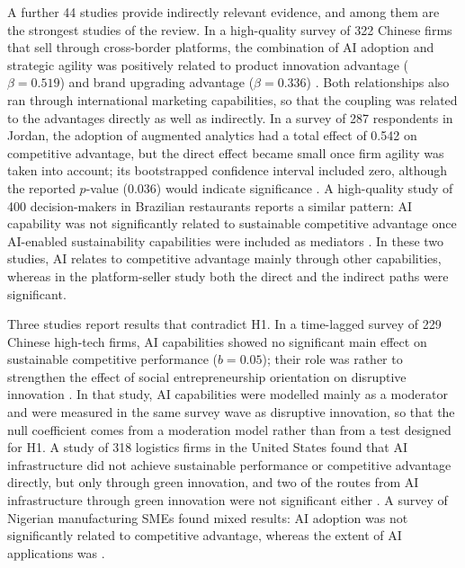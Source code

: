 A further 44 studies provide indirectly relevant evidence, and among them are the strongest studies of the review. In a high-quality survey of 322 Chinese firms that sell through cross-border platforms, the combination of AI adoption and strategic agility was positively related to product innovation advantage ($\beta = 0.519$) and brand upgrading advantage ($\beta = 0.336$) \parencite{guo2025}. Both relationships also ran through international marketing capabilities, so that the coupling was related to the advantages directly as well as indirectly. In a survey of 287 respondents in Jordan, the adoption of augmented analytics had a total effect of 0.542 on competitive advantage, but the direct effect became small once firm agility was taken into account; its bootstrapped confidence interval included zero, although the reported $p$-value (0.036) would indicate significance \parencite{srahin2026}. A high-quality study of 400 decision-makers in Brazilian restaurants reports a similar pattern: AI capability was not significantly related to sustainable competitive advantage once AI-enabled sustainability capabilities were included as mediators \parencite{texeira2026}. In these two studies, AI relates to competitive advantage mainly through other capabilities, whereas in the platform-seller study both the direct and the indirect paths were significant.

Three studies report results that contradict H1. In a time-lagged survey of 229 Chinese high-tech firms, AI capabilities showed no significant main effect on sustainable competitive performance ($b = 0.05$); their role was rather to strengthen the effect of social entrepreneurship orientation on disruptive innovation \parencite{wang2026}. In that study, AI capabilities were modelled mainly as a moderator and were measured in the same survey wave as disruptive innovation, so that the null coefficient comes from a moderation model rather than from a test designed for H1. A study of 318 logistics firms in the United States found that AI infrastructure did not achieve sustainable performance or competitive advantage directly, but only through green innovation, and two of the routes from AI infrastructure through green innovation were not significant either \parencite{chen2026}. A survey of Nigerian manufacturing SMEs found mixed results: AI adoption was not significantly related to competitive advantage, whereas the extent of AI applications was \parencite{mashi2024}.

